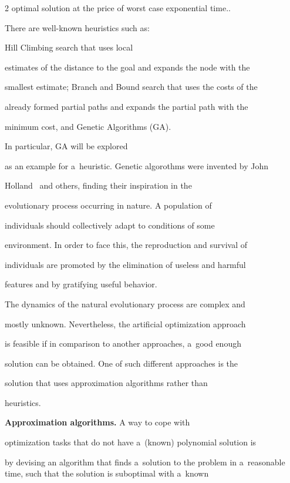 \begin{multicols}{2}
{optimal solution at the price of worst case exponential time.}.


There are well-known heuristics such as:


Hill Climbing search that uses local


estimates of the distance to the goal and expands the node with the


smallest estimate; Branch and Bound search that uses the costs of the


already formed partial paths and expands the partial path with the


minimum cost, and {Genetic Algorithms (GA)}.


In particular,  GA  will be explored


as an example for a~heuristic. Genetic algorothms were invented by John


Holland~\cite{H1971} and others, finding their inspiration in the


evolutionary process occurring in nature. A population of


individuals should collectively adapt to conditions of some


environment. In order to face this, the reproduction and survival of


individuals are promoted by the elimination of useless and harmful


features and by gratifying useful behavior.





The dynamics of the natural evolutionary process are complex and


mostly unknown. Nevertheless, the artificial optimization approach


is feasible if in comparison to another approaches, a~good enough


solution can be obtained. One of such different approaches is the


solution that uses approximation algorithms rather than


heuristics.





\noindent


\textbf{Approximation algorithms.} A way to cope with


optimization tasks that do not have a~(known) polynomial solution is


by devising an algorithm that finds a~solution to the problem in a~reasonable time, such that the solution is suboptimal with a~known



\end{multicols}
